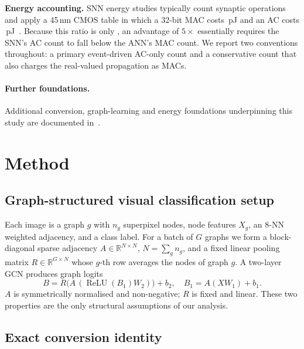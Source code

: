 \textbf{Energy accounting.} SNN energy studies typically count synaptic operations and apply a 45\,nm CMOS table in which a 32-bit MAC costs \MACPJ\,pJ and an AC costs \ACPJ\,pJ~\cite{horowitz2014,eshraghian2023}. Because this ratio is only \MACACRatio, an advantage of $5\times$ essentially requires the SNN's AC count to fall below the ANN's MAC count. We report two conventions throughout: a primary event-driven AC-only count and a conservative count that also charges the real-valued propagation as MACs.

\paragraph{Further foundations.} Additional conversion, graph-learning and energy foundations underpinning this study are documented in~\cite{krizhevsky2009,kugele2020,lecun1998,li2017cifardvs,liu2022spikeconverter,maass1997,orchard2015,zhou2025edge}.

\section{Method}
\label{sec:method}

\subsection{Graph-structured visual classification setup}
\label{ssec:setup}

Each image is a graph $g$ with $n_g$ superpixel nodes, node features $X_g$, an 8-NN weighted adjacency, and a class label. For a batch of $G$ graphs we form a block-diagonal sparse adjacency $A\in\mathbb{R}^{N\times N}$, $N=\sum_g n_g$, and a fixed linear pooling matrix $R\in\mathbb{R}^{G\times N}$ whose $g$-th row averages the nodes of graph $g$. A two-layer GCN produces graph logits
\begin{equation}
B = R\big(A\,(\operatorname{ReLU}(B_1) W_2)\big) + b_2,\quad
B_1 = A (X W_1) + b_1 .
\label{eq:ann}
\end{equation}
$A$ is symmetrically normalised and non-negative; $R$ is fixed and linear. These two properties are the only structural assumptions of our analysis.

\subsection{Exact conversion identity}
\label{ssec:identity}

